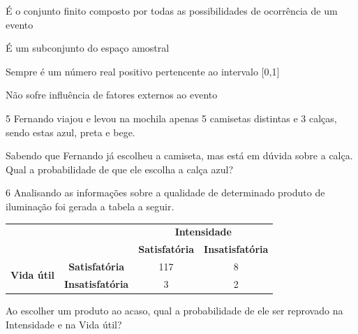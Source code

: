 \begin{boxlist} 
 É o conjunto finito composto por todas as possibilidades de ocorrência de um evento

 É um subconjunto do espaço amostral

 Sempre é um número real positivo pertencente ao intervalo {[}0,1{]}

 Não sofre influência de fatores externos ao evento
\end{boxlist}

\pagebreak
\num{5} Fernando viajou e levou na mochila apenas 5 camisetas distintas e 3
calças, sendo estas azul, preta e bege.

Sabendo que Fernando já escolheu a camiseta, mas está em dúvida sobre a
calça. Qual a probabilidade de que ele escolha a calça azul?

\begin{emptybox}
\end{emptybox}

\num{6} Analisando as informações sobre a qualidade de determinado produto de
iluminação foi gerada a tabela a seguir.

\begin{tabular}{lc|cc|}
\cline{3-4}
\multicolumn{2}{l|}{\multirow{2}{*}{}} & \multicolumn{2}{c|}{\textbf{Intensidade}} \\ \cline{3-4} 
\multicolumn{2}{l|}{} & \multicolumn{1}{c|}{\textbf{Satisfatória}} & \textbf{Insatisfatória} \\ \hline
\multicolumn{1}{|c|}{\multirow{2}{*}{\textbf{Vida útil}}} & \textbf{Satisfatória} & \multicolumn{1}{c|}{117} & 8 \\ \cline{2-4} 
\multicolumn{1}{|c|}{} & \textbf{Insatisfatória} & \multicolumn{1}{c|}{3} & 2 \\ \hline
\end{tabular}

Ao escolher um produto ao acaso, qual a probabilidade de ele ser
reprovado na Intensidade e na Vida útil?

\begin{emptybox}
\end{emptybox}

